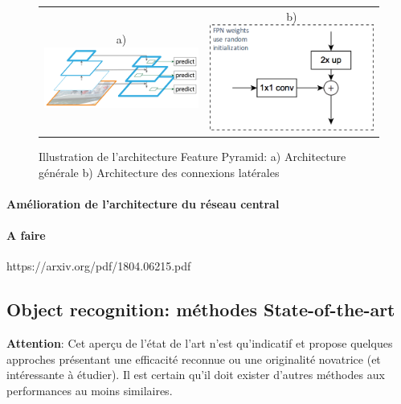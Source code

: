 \begin{figure}
    \begin{tabular}{cc}
        a) \includegraphics[scale=0.4]{./tex/computer-vision/object-recognition/pyramidfeature.png}& b) \includegraphics[scale=0.3]{./tex/computer-vision/object-recognition/conneclate.png}
    \end{tabular}
    \caption{Illustration de l'architecture Feature Pyramid: a) Architecture générale b) Architecture des connexions latérales }
    \label{fepyr}
\end{figure}

\paragraph{Amélioration de l'architecture du réseau central}
\paragraph{A faire}
\cite{denet} https://arxiv.org/pdf/1804.06215.pdf

\subsection{Object recognition: méthodes State-of-the-art}
\textbf{Attention}: Cet aperçu de l'état de l'art n'est qu'indicatif et propose quelques approches présentant une efficacité reconnue ou une originalité novatrice (et intéressante à étudier). Il est certain qu'il doit exister d'autres méthodes aux performances au moins similaires.\\

